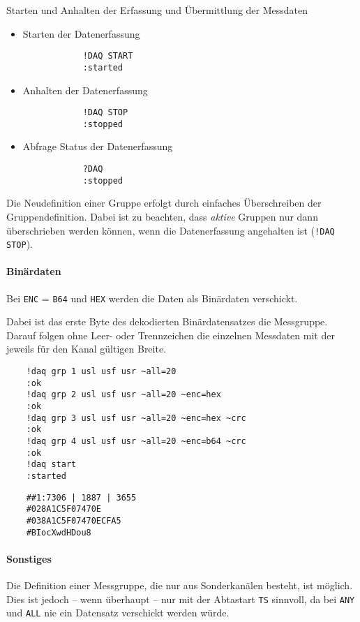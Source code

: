 Starten und Anhalten der Erfassung und Übermittlung der Messdaten
\begin{itemize}
	\item Starten der Datenerfassung
		\begin{verbatim}
			!DAQ START
			:started
		\end{verbatim}
	\item Anhalten der Datenerfassung
		\begin{verbatim}
			!DAQ STOP
			:stopped
		\end{verbatim}
	\item Abfrage Status der Datenerfassung
		\begin{verbatim}
			?DAQ
			:stopped
		\end{verbatim}
\end{itemize}

Die Neudefinition einer Gruppe erfolgt durch einfaches Überschreiben der Gruppendefinition. Dabei ist zu beachten, dass \emph{aktive} Gruppen nur dann überschrieben werden können, wenn die Datenerfassung angehalten ist (\texttt{!DAQ STOP}).


\paragraph{Binärdaten}
Bei \verb|ENC| = \verb|B64| und \verb|HEX| werden die Daten als Binärdaten verschickt.

Dabei ist das erste Byte des dekodierten Binärdatensatzes die Messgruppe. Darauf folgen ohne Leer- oder Trennzeichen die einzelnen Messdaten mit der jeweils für den Kanal gültigen Breite.


\begin{verbatim}
	!daq grp 1 usl usf usr ~all=20
	:ok
	!daq grp 2 usl usf usr ~all=20 ~enc=hex
	:ok
	!daq grp 3 usl usf usr ~all=20 ~enc=hex ~crc
	:ok
	!daq grp 4 usl usf usr ~all=20 ~enc=b64 ~crc
	:ok
	!daq start
	:started
\end{verbatim}

\begin{verbatim}
	##1:7306 | 1887 | 3655
	#028A1C5F07470E
	#038A1C5F07470ECFA5
	#BIocXwdHDou8
\end{verbatim}


\paragraph{Sonstiges}

Die Definition einer Messgruppe, die nur aus Sonderkanälen besteht, ist möglich. Dies ist jedoch -- wenn überhaupt -- nur mit der Abtastart \verb|TS| sinnvoll, da bei \verb|ANY| und \verb|ALL| nie ein Datensatz verschickt werden würde.

